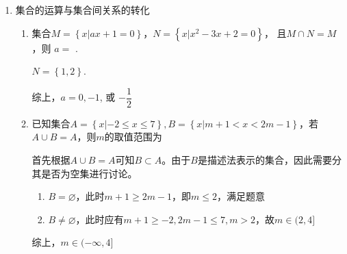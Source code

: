 \begin{enumerate}
\begin{enumerate}
        \begin{jieda}
            $M = [-1, +\infty), N = (-\infty, 1]$
        \end{jieda}      
        \item 设集合$M = \left\{x | y = \sqrt{x} - 1 \right\}， N = \left\{y | y = -x^2+1 \right\}$，则$M \cap N = $\blkda{$[0, 1]$}
        \begin{jieda}
            $M = [0, +\infty), N = (-\infty, 1]$ \\
            \ps 描述法需要看清表示元素的符号。
        \end{jieda}
        \item 设集合$M = \left\{(x, y) | y = \sqrt{x} - 1 \right\}， N = \left\{(x, y) | y = -x^2+1 \right\}$，则$M \cap N = $
        \begin{jieda}
            $\sqrt{x} - 1 = -x^2+1$，解得$x = 1$，故$M \cap N = \left\{(1, 0)\right\}$ \\
            \ps 本题两个集合为两曲线，求交集即两曲线求交点。两曲线求交点联立！数集不联立！
        \end{jieda}
    \end{enumerate}
    \item 集合的运算与集合间关系的转化
    \begin{enumerate}
        \item 集合$M = \left\{x | ax + 1 = 0\right\}$，$N = \left\{x | x^2-3x+2=0\right\}$， 且$M \cap N = M$，则 $a = $ .
        \begin{jieda}
            $N = \left\{1, 2\right\}$. 
            综上，$a = 0, -1$, 或 $-\dfrac{1}{2}$
        \end{jieda}
        \item 已知集合$A = \left\{x | -2 \leq x \leq 7\right\}, B = \left\{x | m+1 < x < 2m-1\right\}$，若$A \cup B = A$，则$m$的取值范围为\blkda{$(-\infty, 4]$}
        \begin{jieda}
            首先根据$A \cup B = A$可知$B \subset A$。由于$B$是描述法表示的集合，因此需要分其是否为空集进行讨论。
            \begin{enumerate}
                \item $B = \varnothing$，此时$m+1 \geq 2m -1$，即$m \leq 2$，满足题意
                \item $B \neq \varnothing$，此时应有$m+1 \geq -2, 2m-1 \leq 7, m > 2$，故$m \in (2, 4]$
            \end{enumerate}
            综上，$m \in (-\infty, 4]$
        \end{jieda}


\end{enumerate}
\end{enumerate}
